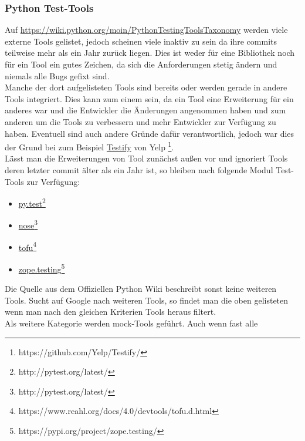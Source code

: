 \subsubsection{Python Test-Tools}\label{python-tools:extlib:python}

Auf \url{https://wiki.python.org/moin/PythonTestingToolsTaxonomy} werden viele
externe Tools gelistet, jedoch scheinen viele inaktiv zu sein da ihre \glspl{commit}
teilweise mehr als ein Jahr zurück liegen. Dies ist weder für eine Bibliothek noch
für ein Tool ein gutes Zeichen, da sich die Anforderungen stetig ändern und niemals
alle Bugs gefixt sind.
\newline
\\
Manche der dort aufgelisteten Tools sind bereits oder werden gerade in andere Tools
integriert. Dies kann zum einem sein, da ein Tool eine Erweiterung für ein anderes
war und die Entwickler die Änderungen angenommen haben und zum anderen um die Tools
zu verbessern und mehr Entwickler zur Verfügung zu haben. Eventuell sind auch
andere Gründe dafür verantwortlich, jedoch war dies der Grund bei zum Beispiel
\href{https://github.com/Yelp/Testify/}{Testify}
von Yelp \footnote{https://github.com/Yelp/Testify/}.
\newline
\\
Lässt man die Erweiterungen von Tool zunächst außen vor und ignoriert Tools deren
letzter \gls{commit} älter als ein Jahr ist, so bleiben nach
\cite{wiki.python:PythonTestingToolsTaxonomy} folgende Modul Test-Tools zur Verfügung:
\begin{itemize}
    \item \href{http://pytest.org/latest/}{py.test}\footnote{http://pytest.org/latest/}
    \item \href{http://pytest.org/latest/}{nose}\footnote{http://pytest.org/latest/}
    \item \href{https://www.reahl.org/docs/4.0/devtools/tofu.d.html}{tofu}\footnote{https://www.reahl.org/docs/4.0/devtools/tofu.d.html}
    \item \href{https://pypi.org/project/zope.testing/}{zope.testing}\footnote{https://pypi.org/project/zope.testing/}
\end{itemize}
Die Quelle aus dem Offiziellen Python Wiki beschreibt sonst keine weiteren Tools.
Sucht auf Google nach weiteren Tools, so findet man die oben gelisteten wenn man
nach den gleichen Kriterien Tools heraus filtert.
\newline
\\
Als weitere Kategorie werden \Gls{mock}-Tools geführt. Auch wenn fast alle
